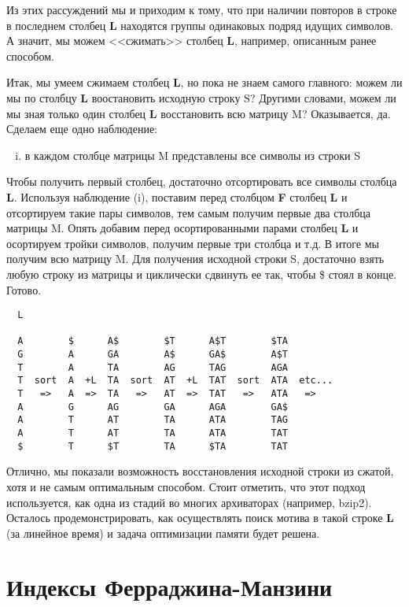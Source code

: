 \documentclass[letterpaper, 11pt]{article}
\begin{document}
Из этих рассуждений мы и приходим к тому, что при наличии повторов в строке в последнем столбец \textbf{L} находятся группы одинаковых подряд идущих символов. А значит, мы можем <<сжимать>> столбец \textbf{L}, например, описанным ранее способом.

Итак, мы умеем сжимаем столбец \textbf{L}, но пока не знаем самого главного: можем ли мы по столбцу \textbf{L} воостановить исходную строку S? Другими словами, можем ли мы зная только один столбец \textbf{L} восстановить всю матрицу M? Оказывается, да. Сделаем еще одно наблюдение:
\begin{enumerate}[(iv)]
\item
в каждом столбце матрицы M представлены все символы из строки S
\end{enumerate}

Чтобы получить первый столбец, достаточно отсортировать все символы столбца \textbf{L}. Используя наблюдение (i), поставим перед столбцом \textbf{F} столбец \textbf{L} и отсортируем такие пары символов, тем самым получим первые два столбца матрицы M. Опять добавим перед осортированными парами столбец \textbf{L} и осортируем тройки символов, получим первые три столбца и т.д. В итоге мы получим всю матрицу M. Для получения исходной строки S, достаточно взять любую строку из матрицы и циклически сдвинуть ее так, чтобы \$ стоял в конце. Готово.

\begin{verbatim}
  L         
 
  A        $      A$        $T      A$T        $TA
  G        A      GA        A$      GA$        A$T
  T        A      TA        AG      TAG        AGA
  T  sort  A  +L  TA  sort  AT  +L  TAT  sort  ATA  etc...
  T   =>   A  =>  TA   =>   AT  =>  TAT   =>   ATA   =>
  A        G      AG        GA      AGA        GA$
  A        T      AT        TA      ATA        TAG
  A        T      AT        TA      ATA        TAT
  $        T      $T        TA      $TA        TAT
\end{verbatim}

Отлично, мы показали возможность восстановления исходной строки из сжатой, хотя и не самым оптимальным способом. Стоит отметить, что этот подход используется, как одна из стадий во многих архиваторах (например, bzip2). Осталось продемонстрировать, как осуществлять поиск мотива в такой строке \textbf{L} (за линейное время) и задача оптимизации памяти будет решена.

\section{Индексы Ферраджина-Манзини}
\end{document}
